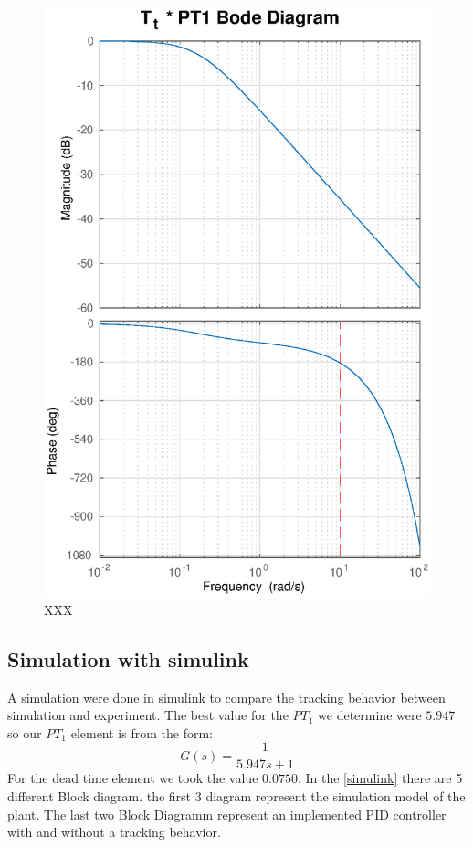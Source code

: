 \begin{figure}
    \centering
    \includegraphics[width=\linewidth]{images/Tt_PT1_bode}
    \caption{XXX}
\end{figure}

\subsection{Simulation with simulink}
A simulation were done in simulink to compare the tracking behavior between simulation and experiment.
The best value for the $PT_{1}$ we determine were $5.947$
so our $PT_{1}$ element is from the form:
\begin{equation}
G(s) = \frac{1}{5.947s+1}
\end{equation}
For the dead time element we took the value $0.0750$. In the \ref{simulink} there are 5 different Block diagram. the first 3 diagram represent the simulation model of the plant. The last two Block Diagramm represent an implemented PID controller with and without a tracking behavior.

